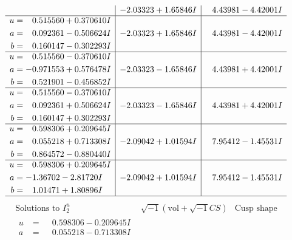 \documentclass[1p]{elsarticle_modified}
\theoremstyle{definition}
\newcommand{\I}{\sqrt{-1}}
\begin{document}
$$\begin{array}{c|c|c}
 & -2.03323 + 1.65846 I & \phantom{-}4.43981 - 4.42001 I \\ \hline\begin{aligned}
u &= \phantom{-}0.515560 + 0.370610 I \\
a &= \phantom{-}0.092361 - 0.506624 I \\
b &= \phantom{-}0.160147 - 0.302293 I\end{aligned}
 & -2.03323 + 1.65846 I & \phantom{-}4.43981 - 4.42001 I \\ \hline\begin{aligned}
u &= \phantom{-}0.515560 - 0.370610 I \\
a &= -0.971553 + 0.576478 I \\
b &= \phantom{-}0.521901 - 0.456852 I\end{aligned}
 & -2.03323 - 1.65846 I & \phantom{-}4.43981 + 4.42001 I \\ \hline\begin{aligned}
u &= \phantom{-}0.515560 - 0.370610 I \\
a &= \phantom{-}0.092361 + 0.506624 I \\
b &= \phantom{-}0.160147 + 0.302293 I\end{aligned}
 & -2.03323 - 1.65846 I & \phantom{-}4.43981 + 4.42001 I \\ \hline\begin{aligned}
u &= \phantom{-}0.598306 + 0.209645 I \\
a &= \phantom{-}0.055218 + 0.713308 I \\
b &= \phantom{-}0.864572 - 0.880440 I\end{aligned}
 & -2.09042 + 1.01594 I & \phantom{-}7.95412 - 1.45531 I \\ \hline\begin{aligned}
u &= \phantom{-}0.598306 + 0.209645 I \\
a &= -1.36702 - 2.81720 I \\
b &= \phantom{-}1.01471 + 1.80896 I\end{aligned}
 & -2.09042 + 1.01594 I & \phantom{-}7.95412 - 1.45531 I\\
 \hline 
 \end{array}$$\newpage$$\begin{array}{c|c|c}  
\text{Solutions to }I^u_{2}& \I (\text{vol} + \sqrt{-1}CS) & \text{Cusp shape}\\
 \hline 
\begin{aligned}
u &= \phantom{-}0.598306 - 0.209645 I \\
a &= \phantom{-}0.055218 - 0.713308 I \\

\end{aligned}
\end{array}$$
\end{document}

